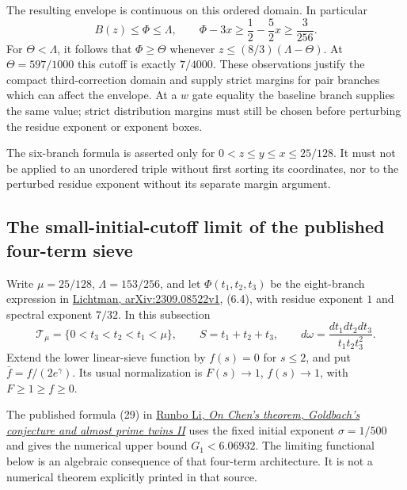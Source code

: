 \documentclass[11pt]{article}
\begin{document}
The resulting envelope is continuous on this ordered domain.
In particular
\[
 B(z)\le\Phi\le\Lambda,
 \qquad \Phi-3x\ge\frac12-\frac52x\ge\frac3{256}.
\]
For $\Theta<\Lambda$, it follows that $\Phi\ge\Theta$ whenever
$z\le(8/3)(\Lambda-\Theta)$.
At $\Theta=597/1000$ this cutoff is exactly $7/4000$.
These observations justify the compact third-correction domain
and supply strict margins for pair branches which can affect
the envelope. At a $w$ gate equality the baseline branch supplies
the same value; strict distribution margins must still be chosen
before perturbing the residue exponent or exponent boxes.

The six-branch formula is asserted only for
$0<z\le y\le x\le25/128$. It must not be applied to an
unordered triple without first sorting its coordinates, nor
to the perturbed residue exponent without its separate margin
argument.


\subsection{The small-initial-cutoff limit of the published four-term sieve}
\label{sec:g1-limit-comparison}

Write $\mu=25/128$, $\Lambda=153/256$, and let
$\Phi(t_1,t_2,t_3)$ be the eight-branch expression in
\href{https://arxiv.org/html/2309.08522v1}{Lichtman,
arXiv:2309.08522v1}, (6.4), with residue exponent $1$ and
spectral exponent $7/32$. In this subsection
\[
 \mathcal T_\mu=\{0<t_3<t_2<t_1<\mu\},\qquad
 S=t_1+t_2+t_3,\qquad d\omega=\frac{dt_1dt_2dt_3}{t_1t_2t_3^2}.
\]
Extend the lower linear-sieve function by $f(s)=0$ for $s\le2$,
and put $\bar f=f/(2e^\gamma)$. Its usual normalization is
$F(s)\to1$, $f(s)\to1$, with $F\ge1\ge f\ge0$.

The published formula (29) in
\href{https://imar.ro/journals/Mathematical_Reports/Pdfs/2026/1_2/3.pdf}
{Runbo Li, \emph{On Chen's theorem, Goldbach's conjecture and almost
prime twins II}} uses the fixed initial exponent $\sigma=1/500$
and gives the numerical upper bound $G_1<6.06932$.
The limiting functional below is an algebraic consequence of that
four-term architecture. It is not a numerical theorem explicitly
printed in that source.
\end{document}

